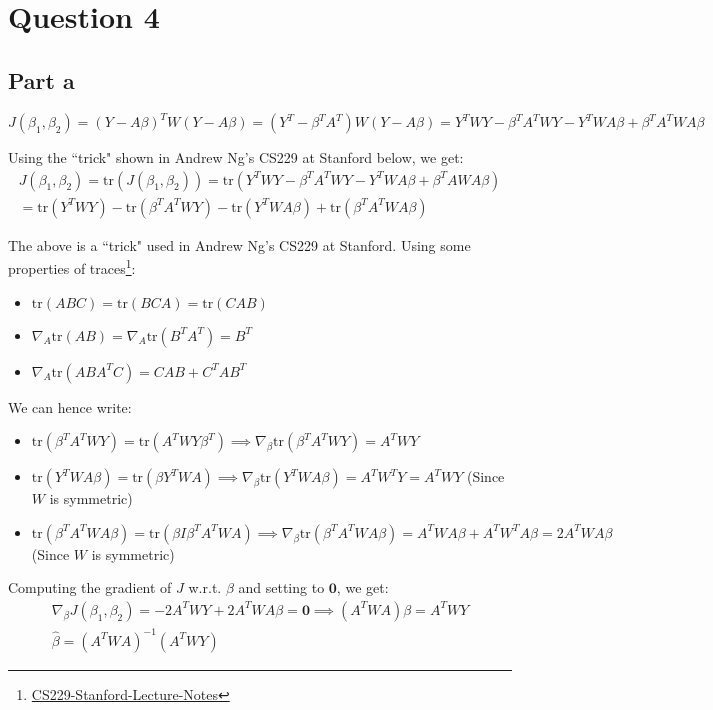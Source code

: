 \documentclass{article}
\newcommand{\tr}{\text{tr}}
\begin{document}
\section*{Question 4}
\subsection*{Part a}
\begin{flushleft}
\begin{equation}
J(\beta_{1}, \beta_{2}) = (Y - A\beta)^{T}W(Y - A\beta) = (Y^{T} - \beta^{T}A^{T})W(Y - A\beta) = Y^{T}WY - \beta^{T}A^{T}WY - Y^{T}WA\beta + \beta^{T}A^{T}WA\beta
\end{equation}

Using the ``trick" shown in Andrew Ng's CS229 at Stanford below, we get:
\begin{multline}
J(\beta_{1}, \beta_{2}) = \tr(J(\beta_{1}, \beta_{2})) = \tr(Y^{T}WY - \beta^{T}A^{T}WY - Y^{T}WA\beta + \beta^{T}AWA\beta) \\ = \tr(Y^{T}WY) - \tr(\beta^{T}A^{T}WY) - \tr(Y^{T}WA\beta) + \tr(\beta^{T}A^{T}WA\beta)
\end{multline}

The above is a ``trick" used in Andrew Ng's CS229 at Stanford. Using some properties of traces\footnote{\href{http://cs229.stanford.edu/notes/cs229-notes1.pdf}{CS229-Stanford-Lecture-Notes}}:
\begin{itemize}
\item \(\tr(ABC) = \tr(BCA) = \tr(CAB)\)
\item \(\nabla_{A} \tr(AB) = \nabla_{A} \tr(B^TA^T) = B^{T}\)
\item \(\nabla_{A} \tr(ABA^{T}C) = CAB + C^{T}AB^{T}\)
\end{itemize}

We can hence write: 
\begin{itemize}
\item \(\tr(\beta^{T}A^{T}WY) = \tr(A^{T}WY\beta^{T}) \implies \nabla_{\beta} \tr(\beta^{T}A^{T}WY) = A^{T}WY\)
\item \(\tr(Y^{T}WA\beta) = \tr(\beta Y^{T}WA) \implies \nabla_{\beta} \tr(Y^{T}WA\beta) = A^{T}W^{T}Y = A^{T}WY\) (Since \(W\) is symmetric)
\item \(\tr(\beta^{T}A^{T}WA\beta) = \tr(\beta I \beta^{T}A^{T}WA) \implies \nabla_{\beta} \tr(\beta^{T}A^{T}WA\beta) = A^{T}WA\beta + A^{T}W^{T}A\beta = 2A^{T}WA\beta\) (Since \(W\) is symmetric)
\end{itemize}

Computing the gradient of \(J\) w.r.t. \(\beta\) and setting to \(\mathbf{0}\), we get:
\begin{gather}
\nabla_{\beta} J(\beta_{1}, \beta_{2}) = -2A^{T}WY + 2A^{T}WA\beta = \mathbf{0} \implies (A^{T}WA)\beta = A^{T}WY \\
\hat{\beta} = \boxed{(A^{T}WA)^{-1}(A^{T}WY)}
\end{gather}
\end{flushleft}
\end{document}
